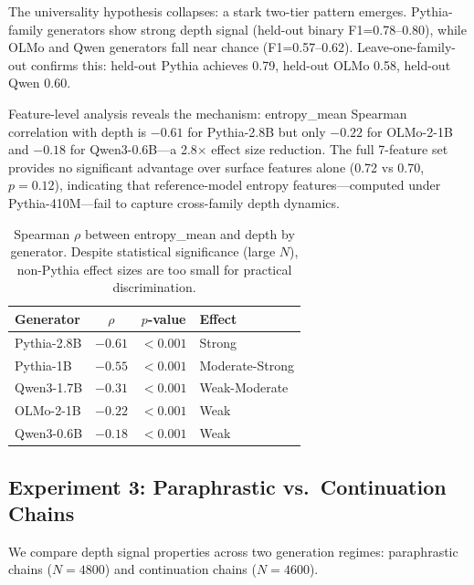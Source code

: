\documentclass[11pt,a4paper]{article}
\begin{document}
The universality hypothesis collapses: a stark two-tier pattern emerges. Pythia-family generators show strong depth signal (held-out binary F1=0.78--0.80), while OLMo and Qwen generators fall near chance (F1=0.57--0.62). Leave-one-family-out confirms this: held-out Pythia achieves 0.79, held-out OLMo 0.58, held-out Qwen 0.60.

Feature-level analysis reveals the mechanism: entropy\_mean Spearman correlation with depth is $-0.61$ for Pythia-2.8B but only $-0.22$ for OLMo-2-1B and $-0.18$ for Qwen3-0.6B---a 2.8$\times$ effect size reduction. The full 7-feature set provides no significant advantage over surface features alone (0.72 vs 0.70, $p=0.12$), indicating that reference-model entropy features---computed under Pythia-410M---fail to capture cross-family depth dynamics.

\begin{table}[h]
\centering
\small
\begin{tabular}{lccl}
\toprule
\textbf{Generator} & \textbf{$\rho$} & \textbf{$p$-value} & \textbf{Effect} \\
\midrule
Pythia-2.8B & $-0.61$ & $<0.001$ & Strong \\
Pythia-1B & $-0.55$ & $<0.001$ & Moderate-Strong \\
Qwen3-1.7B & $-0.31$ & $<0.001$ & Weak-Moderate \\
OLMo-2-1B & $-0.22$ & $<0.001$ & Weak \\
Qwen3-0.6B & $-0.18$ & $<0.001$ & Weak \\
\bottomrule
\end{tabular}
\caption{Spearman $\rho$ between entropy\_mean and depth by generator. Despite statistical significance (large $N$), non-Pythia effect sizes are too small for practical discrimination.}
\label{tab:spearman}
\end{table}

\subsection{Experiment 3: Paraphrastic vs.\ Continuation Chains}
\label{sec:exp3}

We compare depth signal properties across two generation regimes: paraphrastic chains ($N=4800$) and continuation chains ($N=4600$).
\end{document}
